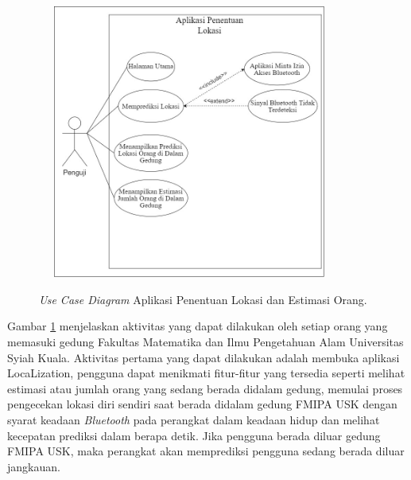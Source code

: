\begin{figure}[H]
	\center
	\shadowbox
	{\includegraphics [width=10cm, height=9cm]{gambar/penentuanlokasi}}
	\caption{\textit{Use Case Diagram} Aplikasi Penentuan Lokasi dan Estimasi Orang.}
	\label{usecaseuser}
\end{figure}

\par Gambar \ref{usecaseuser} menjelaskan aktivitas yang dapat dilakukan oleh setiap orang yang memasuki gedung Fakultas Matematika dan Ilmu Pengetahuan Alam Universitas Syiah Kuala. Aktivitas pertama yang dapat dilakukan adalah membuka aplikasi LocaLization, pengguna dapat menikmati fitur-fitur yang tersedia seperti melihat estimasi atau jumlah orang yang sedang berada didalam gedung, memulai proses pengecekan lokasi diri sendiri saat berada didalam gedung FMIPA USK dengan syarat keadaan \textit{Bluetooth} pada perangkat dalam keadaan hidup dan melihat kecepatan prediksi dalam berapa detik. Jika pengguna berada diluar gedung FMIPA USK, maka perangkat akan memprediksi pengguna sedang berada diluar jangkauan.



